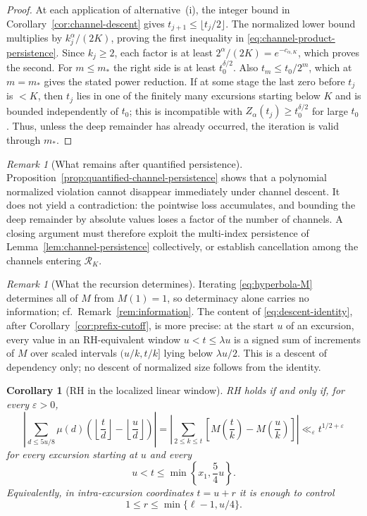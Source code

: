\documentclass[11pt]{amsart}
\numberwithin{equation}{section}
\theoremstyle{plain}
\newtheorem{corollary}[theorem]{Corollary}
\theoremstyle{definition}
\theoremstyle{remark}
\newtheorem{remark}[theorem]{Remark}
\newcommand{\eps}{\varepsilon}
\begin{document}
\begin{proof}
At each application of alternative~\textup{(i)}, the integer bound in
Corollary~\ref{cor:channel-descent} gives $t_{j+1}\le\lfloor t_j/2\rfloor$.
The normalized lower bound multiplies by $k_j^\alpha/(2K)$, proving the
first inequality in \eqref{eq:channel-product-persistence}.  Since
$k_j\ge2$, each factor is at least $2^\alpha/(2K)=e^{-c_{\alpha,K}}$,
which proves the second.  For $m\le m_*$ the right side is at least
$t_0^{\delta/2}$.  Also $t_m\le t_0/2^m$, which at $m=m_*$ gives the stated
power reduction.  If at some stage the last zero before $t_j$ is $<K$, then
$t_j$ lies in one of the finitely many excursions starting below $K$ and is
bounded independently of $t_0$; this is incompatible with
$Z_\alpha(t_j)\ge t_0^{\delta/2}$ for large $t_0$.  Thus, unless the deep
remainder has already occurred, the iteration is valid through $m_*$.
\end{proof}

\begin{remark}[What remains after quantified persistence]
\label{rem:quantified-persistence-gap}
Proposition~\ref{prop:quantified-channel-persistence} shows that a
polynomial normalized violation cannot disappear immediately under channel
descent.  It does not yield a contradiction: the pointwise loss accumulates,
and bounding the deep remainder by absolute values loses a factor of the
number of channels.  A closing argument must therefore exploit the
multi-index persistence of Lemma~\ref{lem:channel-persistence} collectively,
or establish cancellation among the channels entering $\mathcal R_K$.
\end{remark}

\begin{remark}[What the recursion determines]
\label{rem:recursion-content}
Iterating \eqref{eq:hyperbola-M} determines all of $M$ from $M(1)=1$, so
determinacy alone carries no information; cf.\
Remark~\ref{rem:information}.  The content of
\eqref{eq:descent-identity}, after Corollary~\ref{cor:prefix-cutoff}, is
more precise: at the start $u$ of an excursion, every value in an
RH-equivalent window $u<t\le\lambda u$ is a signed sum of increments of
$M$ over scaled intervals $(u/k,t/k]$ lying below $\lambda u/2$.  This is a
descent of dependency only; no descent of normalized size follows from the
identity.
\end{remark}

\begin{corollary}[RH in the localized linear window]
\label{cor:linear-window-RH}
RH holds if and only if, for every $\eps>0$,
\[
\left|\sum_{d\le5u/8}\mu(d)\left(\left\lfloor\frac td\right\rfloor
-\left\lfloor\frac ud\right\rfloor\right)\right|
=\left|\sum_{2\le k\le t}\left[M\left(\frac tk\right)-M\left(\frac uk\right)\right]\right|
\ll_\eps t^{1/2+\eps}
\]
for every excursion starting at $u$ and every
\[
u<t\le\min\left\{x_1,\frac54u\right\}.
\]
Equivalently, in intra-excursion coordinates $t=u+r$ it is enough to
control
\[
1\le r\le\min\{\ell-1,u/4\}.
\]
\end{corollary}
\end{document}
